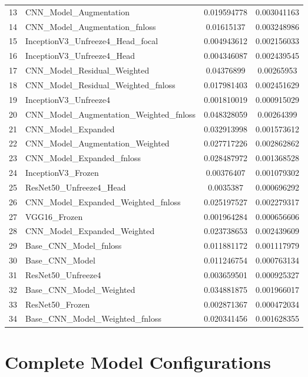 \documentclass[12pt, a4paper]{report}
\begin{document}
\begin{longtable}{
					ll
					S[table-format=1.4, round-precision=4]
					S[table-format=1.4, round-precision=4]
			}
				13 & CNN\_Model\_Augmentation & 0.019594778 & 0.003041163 \\
				14 & CNN\_Model\_Augmentation\_fnloss & 0.01615137 & 0.003248986 \\
				15 & InceptionV3\_Unfreeze4\_Head\_focal & 0.004943612 & 0.002156033 \\
				16 & InceptionV3\_Unfreeze4\_Head & 0.004346087 & 0.002439545 \\
				17 & CNN\_Model\_Residual\_Weighted & 0.04376899 & 0.00265953 \\
				18 & CNN\_Model\_Residual\_Weighted\_fnloss & 0.017981403 & 0.002451629 \\
				19 & InceptionV3\_Unfreeze4 & 0.001810019 & 0.000915029 \\
				20 & CNN\_Model\_Augmentation\_Weighted\_fnloss & 0.048328059 & 0.00264399 \\
				21 & CNN\_Model\_Expanded & 0.032913998 & 0.001573612 \\
				22 & CNN\_Model\_Augmentation\_Weighted & 0.027717226 & 0.002862862 \\
				23 & CNN\_Model\_Expanded\_fnloss & 0.028487972 & 0.001368528 \\
				24 & InceptionV3\_Frozen & 0.00376407 & 0.001079302 \\
				25 & ResNet50\_Unfreeze4\_Head & 0.0035387 & 0.000696292 \\
				26 & CNN\_Model\_Expanded\_Weighted\_fnloss & 0.025197527 & 0.002279317 \\
				27 & VGG16\_Frozen & 0.001964284 & 0.000656606 \\
				28 & CNN\_Model\_Expanded\_Weighted & 0.023738653 & 0.002439609 \\
				29 & Base\_CNN\_Model\_fnloss & 0.011881172 & 0.001117979 \\
				30 & Base\_CNN\_Model & 0.011246754 & 0.000763134 \\
				31 & ResNet50\_Unfreeze4 & 0.003659501 & 0.000925327 \\
				32 & Base\_CNN\_Model\_Weighted & 0.034881875 & 0.001966017 \\
				33 & ResNet50\_Frozen & 0.002871367 & 0.000472034 \\
				34 & Base\_CNN\_Model\_Weighted\_fnloss & 0.020341456 & 0.001628355 \\
			\end{longtable}
	
	\chapter{Complete Model Configurations}
		
\end{document}
